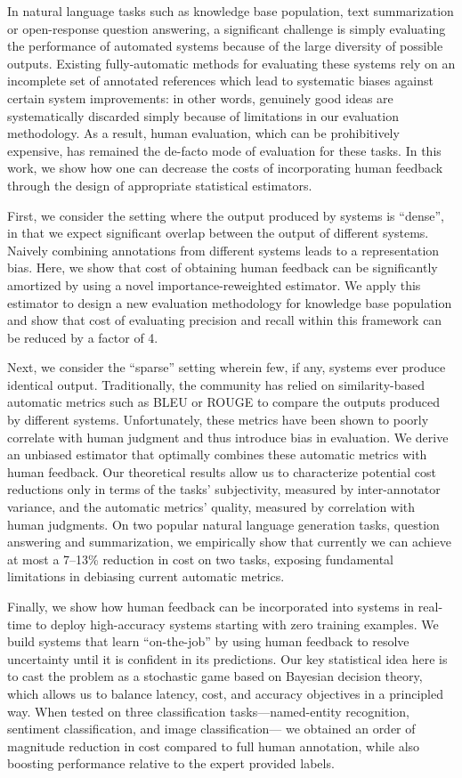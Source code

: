 In natural language tasks such as knowledge base population, text summarization or open-response question answering, a significant challenge is simply evaluating the performance of automated systems because of the large diversity of possible outputs.
Existing fully-automatic methods for evaluating these systems rely on an incomplete set of annotated references which lead to systematic biases against certain system improvements: in other words, genuinely good ideas are systematically discarded simply because of limitations in our evaluation methodology.
As a result, human evaluation, which can be prohibitively expensive, has remained the de-facto mode of evaluation for these tasks.
In this work, we show how one can decrease the costs of incorporating human feedback through the design of appropriate statistical estimators. 

First, we consider the setting where the output produced by systems is ``dense'', in that we expect significant overlap between the output of different systems. 
Naively combining annotations from different systems leads to a representation bias.
Here, we show that cost of obtaining human feedback can be significantly amortized by using a novel importance-reweighted estimator.  
We apply this estimator to design a new evaluation methodology for knowledge base population and show that cost of evaluating precision and recall within this framework can be reduced by a factor of 4.

Next, we consider the ``sparse'' setting wherein few, if any, systems ever produce identical output.
Traditionally, the community has relied on similarity-based automatic metrics such as BLEU or ROUGE to compare the outputs produced by different systems.
Unfortunately, these metrics have been shown to poorly correlate with human judgment and thus introduce bias in evaluation.
We derive an unbiased estimator that optimally combines these automatic metrics with human feedback.
Our theoretical results allow us to characterize potential cost reductions only in terms of the tasks' subjectivity, measured by inter-annotator variance, and the automatic metrics' quality, measured by correlation with human judgments.
On two popular natural language generation tasks, question answering and summarization, we empirically show that currently we can achieve at most a 7--13\% reduction in cost on two tasks, exposing fundamental limitations in debiasing current automatic metrics.

Finally, we show how human feedback can be incorporated into systems in real-time to deploy high-accuracy systems starting with zero training examples.
We build systems that learn ``on-the-job'' by using human feedback to resolve uncertainty until it is confident in its predictions.
Our key statistical idea here is to cast the problem as a stochastic game based on Bayesian decision theory, which allows us to balance latency, cost, and accuracy objectives in a principled way.
When tested on three classification tasks---named-entity recognition, sentiment classification, and image classification--- we obtained an order of magnitude reduction in cost compared to full human annotation, while also boosting performance relative to the expert provided labels.
